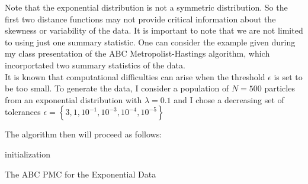 \documentclass[12pt]{article}
\begin{document}
Note that the exponential distribution is not a symmetric distribution. So the first two distance functions may not provide critical information about the skewness or variability of the data. It is important to note that we are not limited to using just one summary statistic. One can consider the example given during my class presentation of the ABC Metropolist-Hastings algorithm, which incorportated two summary statistics of the data. \\

It is known that computational difficulties can arise when the threshold $\epsilon$ is set to be too small. To generate the data, I consider a population of $N=500$ particles from an exponential distribution with $\lambda = 0.1$ and I chose a decreasing set of tolerances $\epsilon = \left\{ 3,1, 10^{-1} , 10^{-3}, 10^{-4}, 10^{-5} \right\}$

The algorithm then will proceed as follows:

\vskip 0.2in

\begin{algorithm}[H]
 initialization\;


 \caption{The ABC PMC for the Exponential Data}
\end{algorithm}
\end{document}
